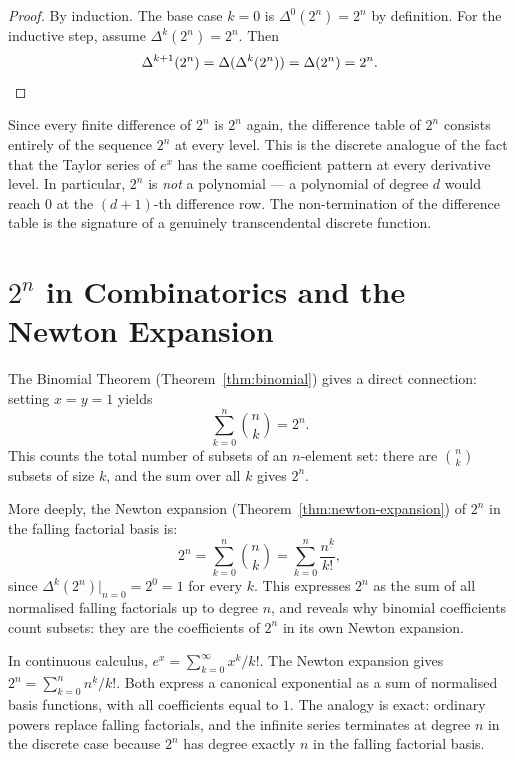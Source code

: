 \begin{proof}
By induction. The base case \(k = 0\) is \(\Delta^0(2^n) = 2^n\) by
definition. For the inductive step, assume \(\Delta^k(2^n) = 2^n\). Then
\[
\Delta^{k+1}(2^n) = \Delta(\Delta^k(2^n)) = \Delta(2^n) = 2^n. \qedhere
\]
\end{proof}

\begin{remark*}
Since every finite difference of \(2^n\) is \(2^n\) again, the difference
table of \(2^n\) consists entirely of the sequence \(2^n\) at every level.
This is the discrete analogue of the fact that the Taylor series of \(e^x\)
has the same coefficient pattern at every derivative level. In particular,
\(2^n\) is \emph{not} a polynomial --- a polynomial of degree \(d\) would
reach \(0\) at the \((d+1)\)-th difference row. The non-termination of
the difference table is the signature of a genuinely transcendental discrete
function.
\end{remark*}

\section*{\texorpdfstring{\(2^n\) in Combinatorics and the Newton Expansion}{2 to the n in Combinatorics and the Newton Expansion}}

The Binomial Theorem (Theorem~\ref{thm:binomial}) gives a direct connection:
setting \(x = y = 1\) yields
\[
\sum_{k=0}^{n} \binom{n}{k} = 2^n.
\]
This counts the total number of subsets of an \(n\)-element set: there are
\(\binom{n}{k}\) subsets of size \(k\), and the sum over all \(k\) gives
\(2^n\).

More deeply, the Newton expansion (Theorem~\ref{thm:newton-expansion}) of \(2^n\)
in the falling factorial basis is:
\[
2^n = \sum_{k=0}^{n} \binom{n}{k} = \sum_{k=0}^{n} \frac{n^{\underline{k}}}{k!},
\]
since \(\Delta^k(2^n)\big|_{n=0} = 2^0 = 1\) for every \(k\). This expresses
\(2^n\) as the sum of all normalised falling factorials up to degree \(n\),
and reveals why binomial coefficients count subsets: they are the coefficients
of \(2^n\) in its own Newton expansion.

\begin{remark*}
In continuous calculus, \(e^x = \sum_{k=0}^{\infty} x^k/k!\). The Newton
expansion gives \(2^n = \sum_{k=0}^{n} n^{\underline{k}}/k!\). Both express
a canonical exponential as a sum of normalised basis functions, with all
coefficients equal to \(1\). The analogy is exact: ordinary powers replace
falling factorials, and the infinite series terminates at degree \(n\) in
the discrete case because \(2^n\) has degree exactly \(n\) in the falling
factorial basis.
\end{remark*}

